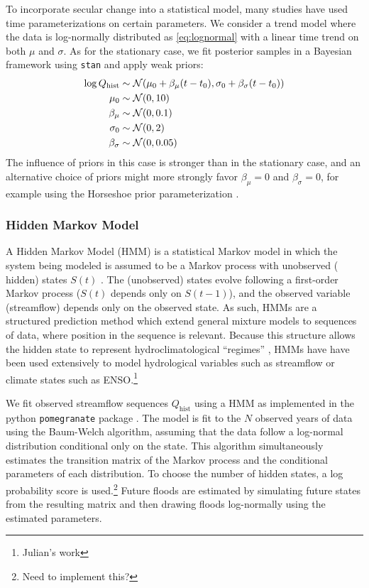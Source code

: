 \documentclass[12pt]{article}
\begin{document}
To incorporate secular change into a statistical model, many studies have used time parameterizations on certain parameters.
We consider a trend model where the data is log-normally distributed as \cref{eq:lognormal} with a linear time trend on both \( \mu \) and \( \sigma \).
As for the stationary case, we fit posterior samples in a Bayesian framework using \texttt{stan} and apply weak priors:
\begin{align}
  \log Q_\text{hist} & \sim \mathcal{N} \qty(\mu_0 + \beta_\mu \qty(t - t_0), \sigma_0 + \beta_\sigma \qty(t-t_0)) \\
  \mu_0 & \sim \mathcal{N} \qty(0, 10) \\
  \beta_\mu & \sim \mathcal{N} \qty(0, 0.1) \\
  \sigma_0 & \sim \mathcal{N} \qty(0, 2) \\
  \beta_\sigma & \sim \mathcal{N} \qty(0, 0.05)
\end{align}
The influence of priors in this case is stronger than in the stationary case, and an alternative choice of priors might more strongly favor \(\beta_\mu=0\) and \(\beta_\sigma=0\), for example using the Horseshoe prior parameterization \citep{Piironen2016a}.

\subsubsection{Hidden Markov Model\label{sec:method-HMM}}

A Hidden Markov Model (HMM) is a statistical Markov model in which the system being modeled is assumed to be a Markov process with unobserved (\ie{} hidden) states \(S(t)\) \citep{Rabiner1986}.
The (unobserved) states evolve following a first-order Markov process (\(S(t)\) depends only on \(S(t-1)\)), and the observed variable (streamflow) depends only on the observed state.
As such, HMMs are a structured prediction method which extend general mixture models to sequences of data, where position in the sequence is relevant.
Because this structure allows the hidden state to represent hydroclimatological ``regimes'' \citep{Reinhold1982,Michelangeli1995,Merz2014}, HMMs have have been used extensively to model hydrological variables such as streamflow \citep[\ie{}][]{Bracken2016} or climate states such as ENSO.\footnote{Julian's work}

We fit observed streamflow sequences \(Q_\text{hist}\) using a HMM as implemented in the python \texttt{pomegranate} package \citep{Schreiber2016}.
The model is fit to the $N$ observed years of data using the Baum-Welch algorithm, assuming that the data follow a log-normal distribution conditional only on the state.
This algorithm simultaneously estimates the transition matrix of the Markov process and the conditional parameters of each distribution.
To choose the number of hidden states, a log probability score is used.\footnote{Need to implement this?}
Future floods are estimated by simulating future states from the resulting matrix and then drawing floods log-normally using the estimated parameters.
\end{document}
